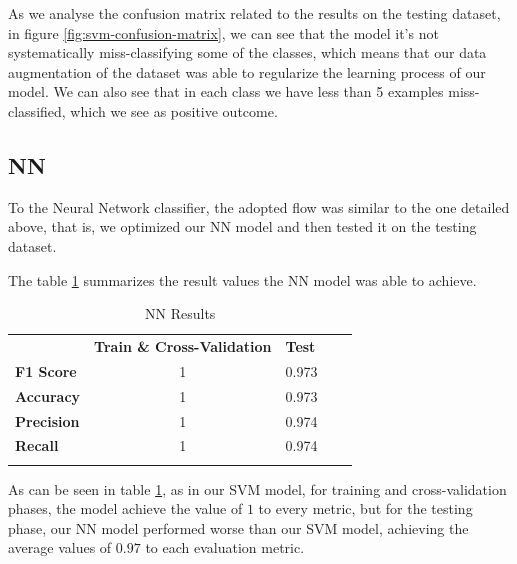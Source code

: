 As we analyse the confusion matrix related to the results on the testing dataset, in figure \ref{fig:svm-confusion-matrix}, we can see that the model it's not systematically miss-classifying some of the classes, which means that our data augmentation of the dataset was able to regularize the learning process of our model. We can also see that in each class we have less than 5 examples miss-classified, which we see as positive outcome.

\subsection{NN}

To the Neural Network classifier, the adopted flow was similar to the one detailed above, that is, we optimized our NN model and then tested it on the testing dataset.

The table \ref{table:nn-results} summarizes the result values the NN model was able to achieve.

\clearpage

\begin{table}[htbp]
\centering
\caption{NN Results}
\begin{tabular}{ccccc}
\cline{2-3}
\multicolumn{1}{l|}{}                & \multicolumn{1}{l|}{\textbf{Train \& Cross-Validation}} & \multicolumn{1}{l|}{\textbf{Test}} &  &  \\ \cline{1-3}
\multicolumn{1}{|l|}{\textbf{F1 Score}} & \multicolumn{1}{c|}{1}                     & \multicolumn{1}{c|}{0.973}                              &  &  \\ \cline{1-3}
\multicolumn{1}{|l|}{\textbf{Accuracy}} & \multicolumn{1}{c|}{1}                     & \multicolumn{1}{c|}{0.973}                              &  &  \\ \cline{1-3}
\multicolumn{1}{|l|}{\textbf{Precision}} & \multicolumn{1}{c|}{1} & \multicolumn{1}{c|}{0.974} & & \\ \cline{1-3}
\multicolumn{1}{|l|}{\textbf{Recall}} & \multicolumn{1}{c|}{1} & \multicolumn{1}{c|}{0.974} & & \\\cline{1-3} & & & & 
\end{tabular}
\label{table:nn-results}
\end{table}

As can be seen in table \ref{table:nn-results}, as in our SVM model, for training and cross-validation phases, the model achieve the value of \(1\) to every metric, but for the testing phase, our NN model performed worse than our SVM model, achieving the average values of \(0.97\) to each evaluation metric. 

